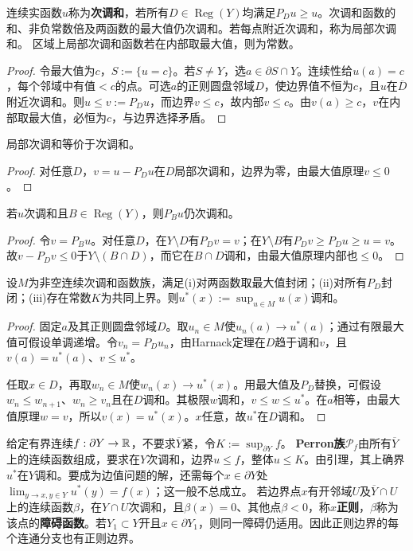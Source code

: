 连续实函数$u$称为\textbf{次调和}，若所有$D\in\operatorname{Reg}(Y)$均满足$P_Du\ge u$。次调和函数的和、非负常数倍及两函数的最大值仍次调和。若每点附近次调和，称为局部次调和。
区域上局部次调和函数若在内部取最大值，则为常数。
\begin{proof}
令最大值为$c$，$S:=\{u=c\}$。若$S\ne Y$，选$a\in\partial S\cap Y$。连续性给$u(a)=c$，每个邻域中有值$<c$的点。可选$a$的正则圆盘邻域$D$，使边界值不恒为$c$，且$u$在$\overline D$附近次调和。则$u\le v:=P_Du$，而边界$v\le c$，故内部$v\le c$。由$v(a)\ge c$，$v$在内部取最大值，必恒为$c$，与边界选择矛盾。
\end{proof}
局部次调和等价于次调和。
\begin{proof}
对任意$D$，$v=u-P_Du$在$D$局部次调和，边界为零，由最大值原理$v\le0$。
\end{proof}
若$u$次调和且$B\in\operatorname{Reg}(Y)$，则$P_Bu$仍次调和。
\begin{proof}
令$v=P_Bu$。对任意$D$，在$Y\setminus D$有$P_Dv=v$；在$Y\setminus B$有$P_Dv\ge P_Du\ge u=v$。故$v-P_Dv\le0$于$Y\setminus(B\cap D)$，而它在$B\cap D$调和，由最大值原理内部也$\le0$。
\end{proof}
设$M$为非空连续次调和函数族，满足(i)对两函数取最大值封闭；(ii)对所有$P_D$封闭；(iii)存在常数$K$为共同上界。则$u^*(x):=\sup_{u\in M}u(x)$调和。
\begin{proof}
固定$a$及其正则圆盘邻域$D$。取$u_n\in M$使$u_n(a)\to u^*(a)$；通过有限最大值可假设单调递增。令$v_n=P_Du_n$，由Harnack定理在$D$趋于调和$v$，且$v(a)=u^*(a)$、$v\le u^*$。

任取$x\in D$，再取$w_n\in M$使$w_n(x)\to u^*(x)$。用最大值及$P_D$替换，可假设$w_n\le w_{n+1}$、$w_n\ge v_n$且在$D$调和。其极限$w$调和，$v\le w\le u^*$。在$a$相等，由最大值原理$w=v$，所以$v(x)=u^*(x)$。$x$任意，故$u^*$在$D$调和。
\end{proof}
给定有界连续$f:\partial Y\to\mathbb R$，不要求$\overline Y$紧，令$K:=\sup_{\partial Y}f$。
\textbf{Perron族}$\mathcal P_f$由所有$\overline Y$上的连续函数组成，要求在$Y$次调和，边界$u\le f$，整体$u\le K$。由引理，其上确界$u^*$在$Y$调和。要成为边值问题的解，还需每个$x\in\partial Y$处$\lim_{y\to x,y\in Y}u^*(y)=f(x)$；这一般不总成立。
若边界点$x$有开邻域$U$及$\overline Y\cap U$上的连续函数$\beta$，在$Y\cap U$次调和，且$\beta(x)=0$、其他点$\beta<0$，称$x$\textbf{正则}，$\beta$称为该点的\textbf{障碍函数}。若$Y_1\subset Y$开且$x\in\partial Y_1$，则同一障碍仍适用。因此正则边界的每个连通分支也有正则边界。
